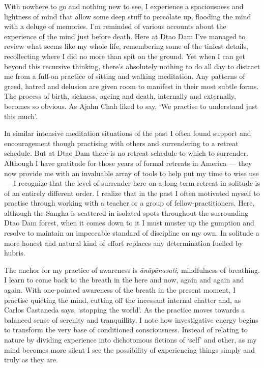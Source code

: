 With nowhere to go and nothing new to see, I experience a spaciousness
and lightness of mind that allow some deep stuff to percolate up,
flooding the mind with a deluge of memories. I'm reminded of various
accounts about the experience of the mind just before death. Here at
Dtao Dam I've managed to review what seems like my whole life,
remembering some of the tiniest details, recollecting where I did no
more than spit on the ground. Yet when I can get beyond this recursive
thinking, there's absolutely nothing to do all day to distract me from a
full-on practice of sitting and walking meditation. Any patterns of
greed, hatred and delusion are given room to manifest in their most
subtle forms. The process of birth, sickness, ageing and death,
internally and externally, becomes so obvious. As Ajahn Chah liked to
say, `We practise to understand just this much'.

In similar intensive meditation situations of the past I often found
support and encouragement though practising with others and surrendering
to a retreat schedule. But at Dtao Dam there is no retreat schedule to
which to surrender. Although I have gratitude for those years of formal
retreats in America --- they now provide me with an invaluable array of
tools to help put my time to wise use --- I recognize that the level of
surrender here on a long-term retreat in solitude is of an entirely
different order. I realize that in the past I often motivated myself to
practise through working with a teacher or a group of
fellow-practitioners. Here, although the Sangha is scattered in isolated
spots throughout the surrounding Dtao Dam forest, when it comes down to
it I must muster up the gumption and resolve to maintain an impeccable
standard of discipline on my own. In solitude a more honest and natural
kind of effort replaces any determination fuelled by hubris.

The anchor for my practice of awareness is \emph{ānāpānasati},
mindfulness of breathing. I learn to come back to the breath in the here
and now, again and again and again. With one-pointed awareness of the
breath in the present moment, I practise quieting the mind, cutting off
the incessant internal chatter and, as Carlos Castaneda says, `stopping
the world'. As the practice moves towards a balanced sense of serenity
and tranquillity, I note how investigative energy begins to transform
the very base of conditioned consciousness. Instead of relating to
nature by dividing experience into dichotomous fictions of `self' and
other, as my mind becomes more silent I see the possibility of
experiencing things simply and truly as they are.


